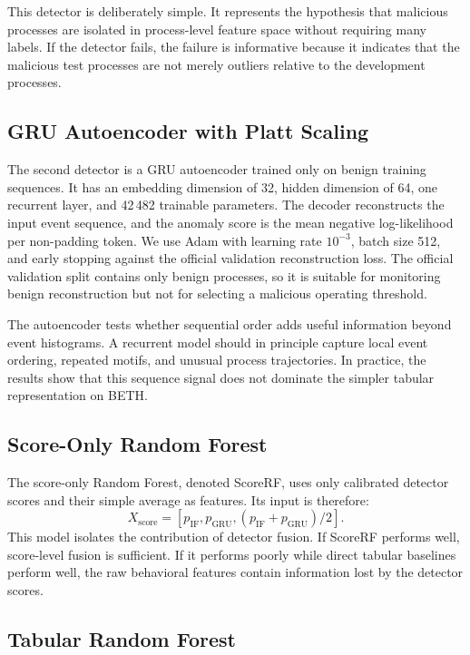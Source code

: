\documentclass[10pt,journal,compsoc]{IEEEtran}
\begin{document}
This detector is deliberately simple. It represents the hypothesis that malicious processes are isolated in process-level feature space without requiring many labels. If the detector fails, the failure is informative because it indicates that the malicious test processes are not merely outliers relative to the development processes.

\subsection{GRU Autoencoder with Platt Scaling}

The second detector is a GRU autoencoder trained only on benign training sequences. It has an embedding dimension of 32, hidden dimension of 64, one recurrent layer, and 42\,482 trainable parameters. The decoder reconstructs the input event sequence, and the anomaly score is the mean negative log-likelihood per non-padding token. We use Adam with learning rate $10^{-3}$, batch size 512, and early stopping against the official validation reconstruction loss. The official validation split contains only benign processes, so it is suitable for monitoring benign reconstruction but not for selecting a malicious operating threshold.

The autoencoder tests whether sequential order adds useful information beyond event histograms. A recurrent model should in principle capture local event ordering, repeated motifs, and unusual process trajectories. In practice, the results show that this sequence signal does not dominate the simpler tabular representation on BETH.

\subsection{Score-Only Random Forest}

The score-only Random Forest, denoted ScoreRF, uses only calibrated detector scores and their simple average as features. Its input is therefore:
\[
X_{\text{score}} = [p_{\text{IF}}, p_{\text{GRU}}, (p_{\text{IF}} + p_{\text{GRU}})/2].
\]
This model isolates the contribution of detector fusion. If ScoreRF performs well, score-level fusion is sufficient. If it performs poorly while direct tabular baselines perform well, the raw behavioral features contain information lost by the detector scores.

\subsection{Tabular Random Forest}
\end{document}
